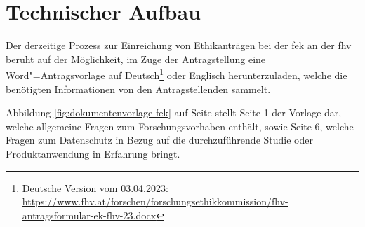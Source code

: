 \documentclass[a4paper,12pt,twoside,numbers=noendperiod]{scrreprt}
\begin{document}
\section{Technischer Aufbau}
\label{sec:technischer-aufbau}

Der derzeitige Prozess zur Einreichung von Ethikanträgen bei der \ac{fek} an der \ac{fhv} beruht auf der Möglichkeit, im Zuge der Antragstellung eine Word"=Antragsvorlage auf Deutsch\footnote{Deutsche Version vom 03.04.2023: \url{https://www.fhv.at/forschen/forschungsethikkommission/fhv-antragsformular-ek-fhv-23.docx}} oder Englisch herunterzuladen, welche die benötigten Informationen von den Antragstellenden sammelt.

Abbildung \ref{fig:dokumentenvorlage-fek} auf Seite \pageref{fig:dokumentenvorlage-fek} stellt Seite 1 der Vorlage dar, welche allgemeine Fragen zum Forschungsvorhaben enthält, sowie Seite 6, welche Fragen zum Datenschutz in Bezug auf die durchzuführende Studie oder Produktanwendung in Erfahrung bringt.
\end{document}
